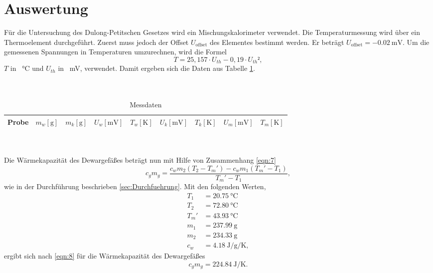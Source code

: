\section{Auswertung}
\label{sec:Auswertung}

Für die Untersuchung des Dulong-Petitschen Gesetzes wird ein Mischungskalorimeter verwendet.
Die Temperaturmessung wird über ein Thermoelement durchgeführt.
Zuerst muss jedoch der Offset $U_{\text{offset}}$ des Elementes bestimmt werden.
Er beträgt $U_{\text{offset}}= \SI{-0,02}{\milli\volt}$.
Um die gemessenen Spannungen in Temperaturen umzurechnen, wird die Formel
\begin{equation}
  T = 25,157 \cdot U_{th} - 0,19 \cdot U_{th}²,
\end{equation}
$T$ in \SI{}{\celsius} und $U_{th}$ in \SI{}{\milli\volt}, verwendet.
Damit ergeben sich die Daten aus Tabelle \ref{tab:1}. \\
\\
\\
\begin{table}
  \centering
  \caption{Messdaten}
  \label{tab:1}
  \begin{tabular}{c c c c c c c c c}
    \toprule
    {Probe} & {$m_w [\si{\gram}]$} & {$m_k [\si{\gram}]$} & {$U_w [\si{\milli\volt}]$} & {$T_w [\si{\kelvin}]$} & {$U_k [\si{\milli\volt}]$} & {$T_k [\si{\kelvin}]$} & {$U_m [\si{\milli\volt}]$} & {$T_m [\si{\kelvin}]$} \\
    \midrule
    
    \bottomrule
  \end{tabular}
\end{table}
\\
\\
Die Wärmekapazität des Dewargefäßes beträgt nun mit Hilfe von Zusammenhang \ref{eqn:7}
\begin{equation}
  c_gm_g = \frac{c_wm_2(T_2-T_m')-c_wm_1(T_m'-T_1)}{T_m'-T_1},
  \label{eqn:8}
\end{equation}
wie in der Durchführung beschrieben \ref{sec:Durchfuehrung}.
Mit den folgenden Werten,
\begin{align}
  T_1 &= \SI{20,75}{\celsius} \\
  T_2 &= \SI{72,80}{\celsius} \\
  T_m'&= \SI{43,93}{\celsius} \\
  m_1 &= \SI{237,99}{\gram} \\
  m_2 &= \SI{234,33}{\gram} \\
  c_w &= \SI{4,18}{\joule\per\gram\per\kelvin},
\end{align}
ergibt sich nach \ref{eqn:8} für die Wärmekapazität des Dewargefäßes
\begin{equation}
  c_gm_g = \SI{224,84}{\joule\per\kelvin}.
\end{equation}

